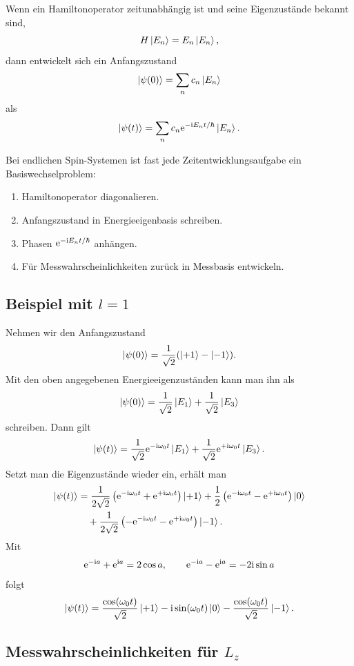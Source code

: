 Wenn ein Hamiltonoperator zeitunabhängig ist und seine Eigenzustände bekannt sind,
\[
    H\left|E_n\right\rangle=E_n\left|E_n\right\rangle,
\]
dann entwickelt sich ein Anfangszustand
\[
    \left|\psi(0)\right\rangle=\sum_n c_n\left|E_n\right\rangle
\]
als
\[
    \left|\psi(t)\right\rangle=\sum_n c_n\mathrm{e}^{-\mathrm{i} E_n t/\hbar}\left|E_n\right\rangle.
\]

\begin{examtipbox}
Bei endlichen Spin-Systemen ist fast jede Zeitentwicklungsaufgabe ein Basiswechselproblem:
\begin{enumerate}
    \item Hamiltonoperator diagonalieren.
    \item Anfangszustand in Energieeigenbasis schreiben.
    \item Phasen \(\mathrm{e}^{-\mathrm{i} E_nt/\hbar}\) anhängen.
    \item Für Messwahrscheinlichkeiten zurück in Messbasis entwickeln.
\end{enumerate}
\end{examtipbox}

\subsection{Beispiel mit \texorpdfstring{\(l=1\)}{l=1}}

Nehmen wir den Anfangszustand
\[
    \left|\psi(0)\right\rangle=\frac{1}{\sqrt2}(\left|+1\right\rangle-\left|-1\right\rangle).
\]
Mit den oben angegebenen Energieeigenzuständen kann man ihn als
\[
    \left|\psi(0)\right\rangle=\frac{1}{\sqrt2}\left|E_1\right\rangle+\frac{1}{\sqrt2}\left|E_3\right\rangle
\]
schreiben. Dann gilt
\[
    \left|\psi(t)\right\rangle=\frac{1}{\sqrt2}\mathrm{e}^{-\mathrm{i}\omega_0t}\left|E_1\right\rangle
    +\frac{1}{\sqrt2}\mathrm{e}^{+\mathrm{i}\omega_0t}\left|E_3\right\rangle.
\]
Setzt man die Eigenzustände wieder ein, erhält man
\begin{align*}
    \left|\psi(t)\right\rangle
    &=\frac{1}{2\sqrt2}\left(\mathrm{e}^{-\mathrm{i}\omega_0t}+\mathrm{e}^{+\mathrm{i}\omega_0t}\right)\left|+1\right\rangle
    +\frac12\left(\mathrm{e}^{-\mathrm{i}\omega_0t}-\mathrm{e}^{+\mathrm{i}\omega_0t}\right)\left|0\right\rangle\\
    &\quad
    +\frac{1}{2\sqrt2}\left(-\mathrm{e}^{-\mathrm{i}\omega_0t}-\mathrm{e}^{+\mathrm{i}\omega_0t}\right)\left|-1\right\rangle.
\end{align*}
Mit
\[
    \mathrm{e}^{-\mathrm{i} a}+\mathrm{e}^{\mathrm{i} a}=2\cos a,
    \qquad
    \mathrm{e}^{-\mathrm{i} a}-\mathrm{e}^{\mathrm{i} a}=-2\mathrm{i}\sin a
\]
folgt
\[
    \left|\psi(t)\right\rangle=\frac{\cos(\omega_0t)}{\sqrt2}\left|+1\right\rangle
    -\mathrm{i}\sin(\omega_0t)\left|0\right\rangle
    -\frac{\cos(\omega_0t)}{\sqrt2}\left|-1\right\rangle.
\]

\subsection{Messwahrscheinlichkeiten für \texorpdfstring{\(L_z\)}{Lz}}

